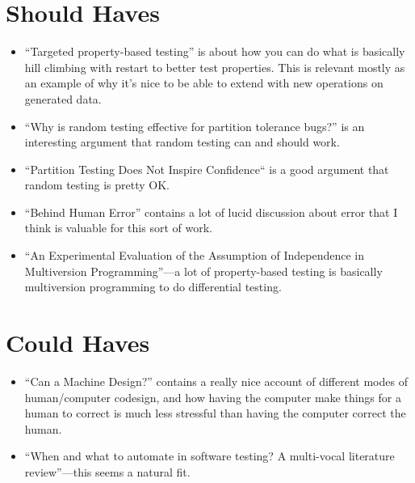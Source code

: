 \section{Should Haves}

\begin{itemize}
\item ``Targeted property-based testing''\cite{DBLP:conf/issta/LoscherS17} is about how you can do what is basically hill climbing with restart to better test properties.
This is relevant mostly as an example of why it's nice to be able to extend with new operations on generated data.
\item ``Why is random testing effective for partition tolerance bugs?''\cite{DBLP:journals/pacmpl/MajumdarN18} is an interesting argument that random testing can and should work.
\item ``Partition Testing Does Not Inspire Confidence``\cite{DBLP:journals/tse/HamletT90} is a good argument that random testing is pretty OK.
\item ``Behind Human Error''\cite{BehindHumanError} contains a lot of lucid discussion about error that I think is valuable for this sort of work.
\item ``An Experimental Evaluation of the Assumption of Independence in Multiversion Programming''\cite{DBLP:journals/tse/KnightL86}---a
lot of property-based testing is basically multiversion programming to do differential testing.
\end{itemize}

\section{Could Haves}

\begin{itemize}
\item ``Can a Machine Design?''\cite{doi:10.1162/07479360152681083} contains a really nice account of different modes of human/computer codesign,
and how having the computer make things for a human to correct is much less stressful than having the computer correct the human.
\item ``When and what to automate in software testing? {A} multi-vocal literature review''\cite{DBLP:journals/infsof/GarousiM16}---this
seems a natural fit.
\end{itemize}





